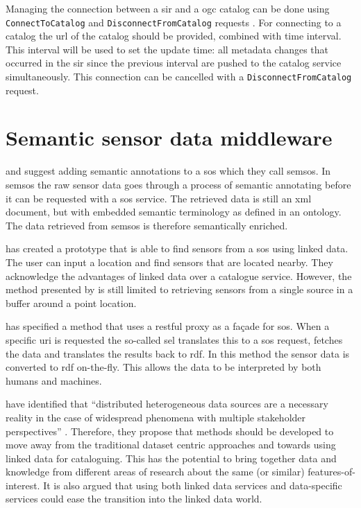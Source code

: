 Managing the connection between a \ac{sir} and a \ac{ogc} catalog can be done using \texttt{ConnectToCatalog} and \texttt{DisconnectFromCatalog} requests \citep{SW:OGC3}. For connecting to a catalog the \ac{url} of the catalog should be provided, combined with time interval. This interval will be used to set the update time: all metadata changes that occurred in the \ac{sir} since the previous interval are pushed to the catalog service simultaneously. This connection can be cancelled with a \texttt{DisconnectFromCatalog} request.  


\section{Semantic sensor data middleware}
\label{par:middleware}
\cite{SSW:Henson} and \cite{SSW:Pschorr} suggest adding semantic annotations to a \ac{sos} which they call \ac{semsos}. In \ac{semsos} the raw sensor data goes through a process of semantic annotating before it can be requested with a \ac{sos} service. The retrieved data is still an \ac{xml} document, but with embedded semantic terminology as defined in an ontology. The data retrieved from \ac{semsos} is therefore semantically enriched.  

\cite{SSW:Pschorr2} has created a prototype that is able to find sensors from a \ac{sos} using linked data. The user can input a location and find sensors that are located nearby. They acknowledge the advantages of linked data over a catalogue service. However, the method presented by \cite{SSW:Pschorr2} is still limited to retrieving sensors from a single source in a buffer around a point location.  

\cite{SSW:Janowicz} has specified a method that uses a \ac{rest}ful proxy as a fa\c{c}ade for \ac{sos}. When a specific \ac{uri} is requested the so-called \ac{sel} translates this to a \ac{sos} request, fetches the data and translates the results back to \ac{rdf}. In this method the sensor data is converted to \ac{rdf} on-the-fly. This allows the data to be interpreted by both humans and machines.  

\cite{SSW:Atkinson} have identified that \enquote{distributed heterogeneous data sources are a necessary reality in the case of widespread phenomena with multiple stakeholder perspectives} \cite[p.129]{SSW:Atkinson}. Therefore, they propose that methods should be developed to move away from the traditional dataset centric approaches and towards using linked data for cataloguing. This has the potential to bring together data and knowledge from different areas of research about the same (or similar) features-of-interest. It is also argued that using both linked data services and data-specific services could ease the transition into the linked data world. 

